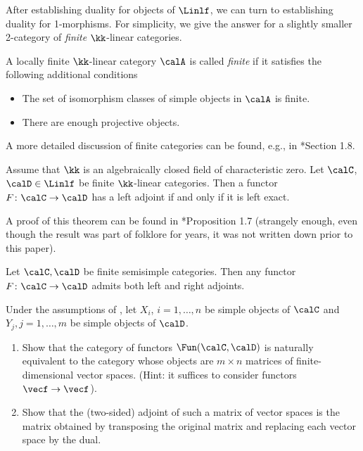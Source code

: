  After establishing duality for objects of $\Linlf$, we can turn to establishing
 duality for 1-morphisms. For simplicity, we give the answer for a slightly
 smaller 2-category of \emph{finite} $\kk$-linear categories.

 \begin{definition}\label{d:finite}
    A locally finite $\kk$-linear category $\calA$ is called \emph{finite} if
    it satisfies the following additional conditions
    \begin{itemize}
      \item The set of isomorphism classes of simple objects in $\calA$ is
        finite.
      \item There are enough projective objects.
    \end{itemize}
\end{definition}
A more detailed discussion of finite categories can be found, e.g., in
*{Section 1.8}.

 \begin{theorem}\label{t:exact-adjoint}
  Assume that $\kk$ is an algebraically closed field of characteristic zero. Let
  $\calC$, $\calD\in \Linlf$ be finite $\kk$-linear categories. Then a functor
  $F\colon \calC\to \calD$ has a left adjoint if and only if it is left exact.
\end{theorem}
A proof of this theorem can be found in *{Proposition 1.7}
(strangely enough, even though the result was part of folklore for years, it was
not written down prior to this paper).

\begin{corollary}\label{c:adjoint-semisimple}
  Let $\calC, \calD$ be finite semisimple categories. Then any functor $F\colon
  \calC\to \calD$ admits both left and right adjoints.
\end{corollary}

\begin{exercise}\label{ec:adjoint-semisimple}
  Under the assumptions of , let $X_i$, $i=1, \dots,
  n$ be simple objects of $\calC$ and $Y_j, j=1, \dots, m$ be simple objects of
  $\calD$.

  \begin{enumerate}
    \item Show that the category of functors $\Fun(\calC, \calD)$ is naturally
      equivalent to the category whose objects are $m\times n$ matrices of
    finite-dimensional vector spaces. (Hint: it suffices to consider functors
    $\vecf\to \vecf$).

    \item Show that the (two-sided) adjoint of such a matrix of vector spaces is
    the matrix obtained by transposing the original matrix and replacing each
    vector space by the dual.
  \end{enumerate}
\end{exercise}

